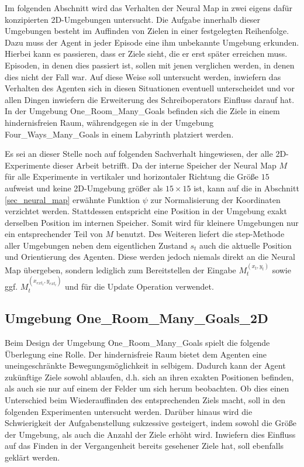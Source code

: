 Im folgenden Abschnitt wird das Verhalten der Neural Map in zwei eigens dafür konzipierten 2D-Umgebungen untersucht. Die Aufgabe innerhalb dieser Umgebungen besteht im Auffinden von Zielen in einer festgelegten Reihenfolge. Dazu muss der Agent in jeder Episode eine ihm unbekannte Umgebung erkunden. Hierbei kann es passieren, dass er Ziele sieht, die er erst später erreichen muss. Episoden, in denen dies passiert ist, sollen mit jenen verglichen werden, in denen dies nicht der Fall war. Auf diese Weise soll untersucht werden, inwiefern das Verhalten des Agenten sich in diesen Situationen eventuell unterscheidet und vor allen Dingen inwiefern die Erweiterung des Schreiboperators Einfluss darauf hat. In der Umgebung \glqq One\_Room\_Many\_Goals\grqq{} befinden sich die Ziele in einem hindernisfreien Raum, währendgegen sie in der Umgebung \glqq Four\_Ways\_Many\_Goals\grqq{} in einem Labyrinth platziert werden.

Es sei an dieser Stelle noch auf folgenden Sachverhalt hingewiesen, der alle 2D-Experimente dieser Arbeit betrifft. Da der interne Speicher der Neural Map $M$ für alle Experimente in vertikaler und horizontaler Richtung die Größe $15$ aufweist und keine 2D-Umgebung größer als $15 \times 15$ ist, kann auf die in Abschnitt \ref{sec_neural_map} erwähnte Funktion $\psi$ zur Normalisierung der Koordinaten verzichtet werden. Stattdessen entspricht eine Position in der Umgebung exakt derselben Position im internen Speicher. Somit wird für kleinere Umgebungen nur ein entsprechender Teil von $M$ benutzt. Des Weiteren liefert die step-Methode aller Umgebungen neben dem eigentlichen Zustand $s_t$ auch die aktuelle Position und Orientierung des Agenten. Diese werden jedoch niemals direkt an die Neural Map übergeben, sondern lediglich zum Bereitstellen der Eingabe $M_t^{(x_t,y_t)}$ sowie ggf. $M_t^{(x_{ext_t},y_{ext_t})}$ und für die Update Operation verwendet.

\subsection{Umgebung \glqq One\_Room\_Many\_Goals\_2D\grqq}
\label{subsec_ormg}

Beim Design der Umgebung \glqq One\_Room\_Many\_Goals\grqq{} spielt die folgende Überlegung eine Rolle. Der hindernisfreie Raum bietet dem Agenten eine uneingeschränkte Bewegungsmöglichkeit in selbigem. Dadurch kann der Agent zukünftige Ziele sowohl ablaufen, d.h. sich an ihren exakten Positionen befinden, als auch sie nur auf einem der Felder um sich herum beobachten. Ob dies einen Unterschied beim Wiederauffinden des entsprechenden Ziels macht, soll in den folgenden Experimenten untersucht werden. Darüber hinaus wird die Schwierigkeit der Aufgabenstellung sukzessive gesteigert, indem sowohl die Größe der Umgebung, als auch die Anzahl der Ziele erhöht wird. Inwiefern dies Einfluss auf das Finden in der Vergangenheit bereits gesehener Ziele hat, soll ebenfalls geklärt werden.

